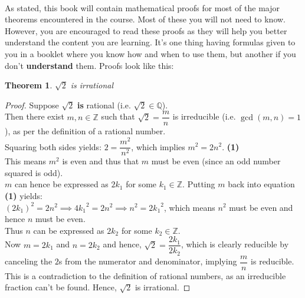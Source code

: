\documentclass[12pt, a4paper, titlepage, twoside]{article}
\newcommand*{\Z}{\mathbb{Z}}
\newcommand*{\Q}{\mathbb{Q}}
\newtheorem*{theorem*}{Theorem}
\begin{document}
	\paragraph{}
	As stated, this book will contain mathematical proofs for most of the major theorems encountered in the course. Most of these
	you will not need to know. However, you are encouraged to read these proofs as they will help you better understand the content
	you are learning. It's one thing having formulas given to you in a booklet where you know how and when to use them, but another
	if you don't \textbf{understand} them. Proofs look like this:\\
	
	\begin{pf}
		\label{pf:root2}
		\begin{theorem*}
			$\sqrt{2}$ is irrational
		\end{theorem*}

		\tcbline		
		
		\begin{proof}
			Suppose $\sqrt{2}$ \textbf{is} rational (i.e. $\sqrt{2} \in \Q$).\\
			
			Then there exist $m, n \in \Z$ such that $\sqrt{2} =  \dfrac{m}{n}$ is irreducible (i.e. $\gcd(m,n) = 1$), 
			as per the definition of a rational number. \\
			
			Squaring both sides yields: $2 = \dfrac{m^2}{n^2}$, which implies $m^2 = 2n^2$. \hfill \textbf{(1)} \\
			
			This means $m^2$ is even and thus that $m$ must be even (since an odd number squared is odd).\\
			
			$m$ can hence be expressed as $2k_1$ for some $k_1 \in \Z$. Putting $m$ back into equation \textbf{(1)} yields:\\
			
			$(2k_1)^2 = 2n^2 \implies 4{k_1}^2 = 2n^2 \implies n^2 = 2{k_1}^2$, which means $n^2$ must be even and hence $n$
			must be even.\\
			
			Thus $n$ can be expressed as $2k_2$ for some $k_2 \in \Z$.\\
			
			Now $m = 2k_1$ and $n = 2k_2$ and hence, $\sqrt{2} = \dfrac{2k_1}{2k_2}$, which is clearly reducible by canceling
			the $2$s from the numerator and denominator, implying $\dfrac{m}{n}$ is reducible.\\
			
			This is a contradiction to the definition of rational numbers, as an irreducible fraction can't be found. Hence,
			$\sqrt{2}$ is irrational.
		\end{proof}
		
	\end{pf}
	
\end{document}
